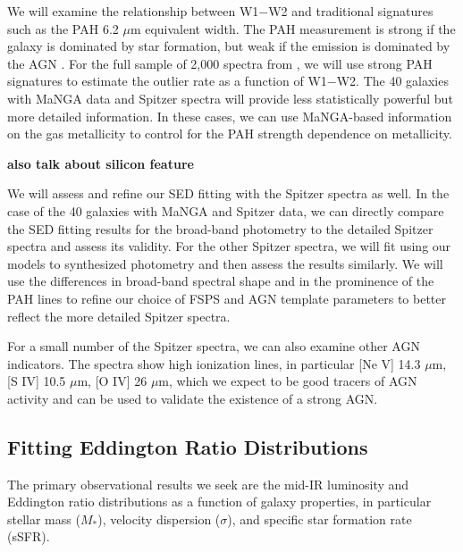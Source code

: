 \documentclass[12pt, preprint]{hacked-aastex}
\begin{document}
We will examine the relationship between W1$-$W2 and traditional
signatures such as the PAH 6.2 $\mu$m equivalent width. The PAH
measurement is strong if the galaxy is dominated by star formation,
but weak if the emission is dominated by the AGN \cite{sajina22a}.
For the full sample of 2,000 spectra from \cite{lambrides}, we will
use strong PAH signatures to estimate the outlier rate as a function
of W1$-$W2.  The 40 galaxies with MaNGA data and Spitzer spectra will
provide less statistically powerful but more detailed information. In
these cases, we can use MaNGA-based information on the gas metallicity
to control for the PAH strength dependence on metallicity.

{\bf also talk about silicon feature}

We will assess and refine our SED fitting with the Spitzer spectra as
well.  In the case of the 40 galaxies with MaNGA and Spitzer data, we
can directly compare the SED fitting results for the broad-band
photometry to the detailed Spitzer spectra and assess its
validity. For the other Spitzer spectra, we will fit using our models
to synthesized photometry and then assess the results similarly. We
will use the differences in broad-band spectral shape and in the
prominence of the PAH lines to refine our choice of FSPS and AGN
template parameters to better reflect the more detailed Spitzer
spectra.

For a small number of the Spitzer spectra, we can also examine other
AGN indicators. The spectra show high ionization lines, in particular
[Ne V] 14.3 $\mu$m, [S IV] 10.5 $\mu$m, [O IV] 26 $\mu$m, which we
expect to be good tracers of AGN activity and can be used to validate
the existence of a strong AGN.

\subsection{Fitting Eddington Ratio Distributions}
\label{sec:erd}

The primary observational results we seek are the mid-IR luminosity
and Eddington ratio distributions as a function of galaxy properties,
in particular stellar mass ($M_\ast$), velocity dispersion ($\sigma$),
and specific star formation rate (sSFR).
\end{document}
